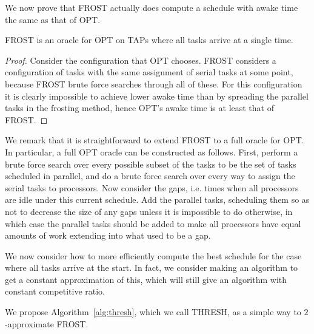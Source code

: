 We now prove that FROST actually does compute a schedule with
awake time the same as that of OPT.
\begin{lemma}
  \label{lem:frosting} 
  FROST is an oracle for OPT on TAPs where all tasks arrive at a single time.
\end{lemma}
\begin{proof}
  Consider the configuration that OPT chooses. FROST considers
  a configuration of tasks with the same assignment of serial
  tasks at some point, because FROST brute force searches
  through all of these. For this configuration it is clearly
  impossible to achieve lower awake time than by spreading the
  parallel tasks in the frosting method, hence OPT's awake time
  is at least that of FROST.
\end{proof}

We remark that it is straightforward to extend FROST to a full
oracle for OPT. In particular, a full OPT oracle can be
constructed as follows. First, perform a brute force search over every
possible subset of the tasks to be the set of tasks scheduled in
parallel, and do a brute force search over every way to assign
the serial tasks to processors. Now consider the gaps, i.e. times
when all processors are idle under this current schedule. Add the
parallel tasks, scheduling them so as not to decrease the size of
any gaps unless it is impossible to do otherwise, in which case
the parallel tasks should be added to make all processors have
equal amounts of work extending into what used to be a gap.

We now consider how to more efficiently compute the best schedule
for the case where all tasks arrive at the start. In fact, we
consider making an algorithm to get a constant approximation of
this, which will still give an algorithm with constant
competitive ratio.

We propose Algorithm~\ref{alg:thresh}, which we call THRESH, as a
simple way to $2$-approximate FROST.

